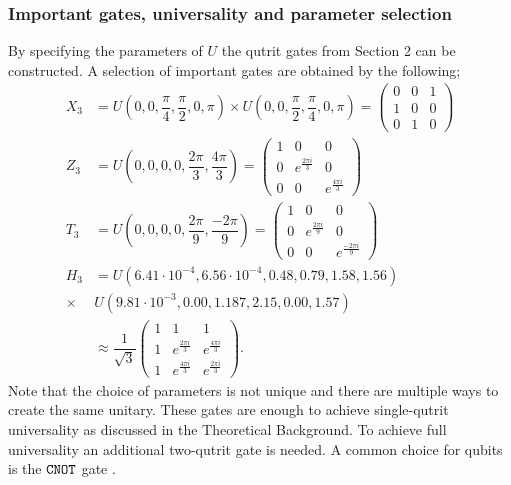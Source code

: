 \subsubsection{Important gates, universality and parameter selection}
By specifying the parameters of $U$ the qutrit gates from Section 2 can be constructed. A selection of important gates are obtained by the following;
\begin{equation}
\begin{aligned}
X_3 &= U(0,0,\dfrac{\pi}{4},\dfrac{\pi}{2},0,\pi)\times U(0,0,\dfrac{\pi}{2},\dfrac{\pi}{4},0,\pi) 
= \begin{pmatrix}
0&0&1
\\
1&0&0
\\
0&1&0
\end{pmatrix}
\\ 
Z_3 &= U(0,0,0,0,\dfrac{2\pi}{3},\dfrac{4\pi}{3})
= \begin{pmatrix}
1&0&0
\\
0&e^{\frac{2\pi i}{3}}&0
\\
0&0&e^{\frac{4\pi i}{3}}
\end{pmatrix}
\\
T_3 &= U(0,0,0,0,\dfrac{2\pi}{9},\dfrac{-2\pi}{9})
= \begin{pmatrix}
1&0&0
\\
0&e^{\frac{2\pi i}{9}}&0
\\
0&0&e^{\frac{-2\pi i}{9}}
\end{pmatrix}
\\
H_3 &= U(6.41\cdot 10^{-4}, 6.56\cdot 10^{-4}, 0.48, 0.79, 1.58, 1.56)\\ \times &U(9.81\cdot 10^{-3}, 0.00, 1.187, 2.15, 0.00, 1.57)\\
&\approx \dfrac{1}{\sqrt{3}}\begin{pmatrix}
1&1&1
\\
1&e^{\frac{2\pi i}{3}}&e^{\frac{4\pi i}{3}}
\\
1&e^{\frac{4\pi i}{3}}&e^{\frac{2\pi i}{3}}
\end{pmatrix}.
\end{aligned}
\end{equation}
Note that the choice of parameters is not unique and there are multiple ways to create the same unitary. These gates are enough to achieve single-qutrit universality as discussed in the Theoretical Background. To achieve full universality an additional two-qutrit gate is needed. A common choice for qubits is the ${\tt CNOT}$ gate \cite{qudit}.

